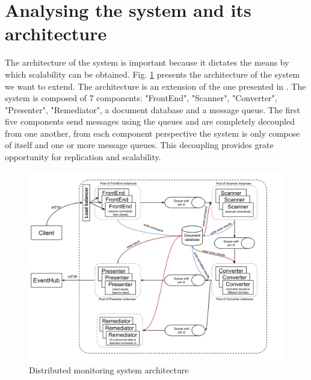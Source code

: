 \section{Analysing the system and its architecture}
The architecture of the system is important because it dictates the means by which scalability can be obtained. Fig. \ref{fig:systemArchitecture} presents the architecture of the system we want to extend. The architecture is an extension of the one presented in \cite{IrimieAndPetcu}. The system is composed of 7 components: "FrontEnd", "Scanner", "Converter", "Presenter", "Remediator", a document database and a message queue. The first five components send messages using the queues and are completely decoupled from one another, from each component perspective the system is only compose of itself and one or more message queues. This decoupling provides grate opportunity for replication and scalability.

\begin{figure}[ht]
\centering
\includegraphics[width=\linewidth]{./img/MonitoringSystemArchitectureRemediation.png}
\caption{Distributed monitoring system architecture}
\label{fig:systemArchitecture}
\end{figure}

